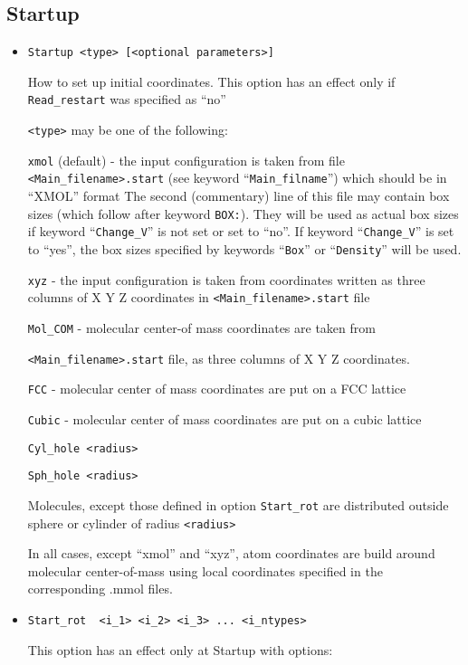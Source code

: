 \documentclass{article}
\begin{document}
\subsection{Startup}

\begin{itemize}
\item
\verb|Startup <type> [<optional parameters>]|

How to set up initial coordinates.
This option has an effect only if \verb|Read_restart| was specified as ``no'' 

\verb|<type>| may be one of the following:

\verb|xmol| (default) - the input configuration is taken from file 
\verb|<Main_filename>.start|
(see keyword ``\verb|Main_filname|'') which should be in ``XMOL'' format
The second (commentary) line of this file may contain box sizes (which 
follow after keyword \verb|BOX:|). They will be used as actual box sizes
if keyword ``\verb|Change_V|'' is not set or set to ``no''. If 
keyword ``\verb|Change_V|'' is set to ``yes'', the box sizes
specified by keywords ``\verb|Box|'' or ``\verb|Density|'' will be used. 

\verb|xyz|   - the input configuration is taken from coordinates written as 
three columns of X Y Z coordinates in \verb|<Main_filename>.start| file

\verb|Mol_COM| - molecular center-of mass coordinates are taken from 

\verb|<Main_filename>.start| file, as three columns of X Y Z coordinates. 

\verb|FCC| - molecular center of mass coordinates are put on a FCC lattice  

\verb|Cubic| - molecular center of mass coordinates are put on a cubic 
lattice  

\verb|Cyl_hole <radius>|

\verb|Sph_hole <radius>|

Molecules, except those defined in option \verb|Start_rot| are distributed
outside sphere or cylinder of radius \verb|<radius>|

In all cases, except ``xmol'' and ``xyz'', atom coordinates are build
around molecular center-of-mass using local coordinates specified in the
corresponding .mmol files.

\item
\verb|Start_rot  <i_1> <i_2> <i_3> ... <i_ntypes>|

This option has an effect only at Startup with options:


\end{itemize}
\end{document}
